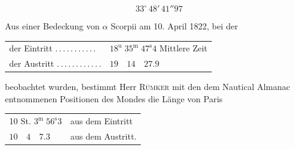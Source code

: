 \[
33^{\circ}\,48'\,41''97
\]

Aus einer Bedeckung von $\alpha$ Scorpii am 10. April 1822, bei der

% 
\begin{center}
\small
\begin{tabular}{l l}
der Eintritt \mbox{.\,.\,.\,.\,.\,.\,.\,.\,.\,.\,.} & $18^{\mathrm{u}}\;35^{\mathrm{m}}\;47^{\mathrm{s}}4$ Mittlere Zeit \\
der Austritt \mbox{.\,.\,.\,.\,.\,.\,.\,.\,.\,.\,.\,.} & $19\quad14\quad27.9$
\end{tabular}
\end{center}

\noindent beobachtet wurden, bestimmt Herr \textsc{Rümker} mit den dem Nautical Almanac entnommenen Positionen des Mondes die Länge von Paris
\begin{center}
\begin{tabular}{l l}
10 St. $3^{\mathrm{m}}\;56^{\mathrm{s}}3$ & aus dem Eintritt \\
$10\quad4\quad7.3$ & aus dem Austritt.
\end{tabular}
\end{center}
